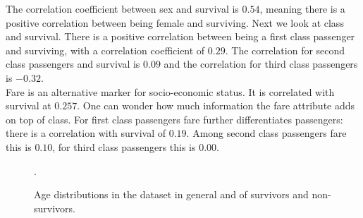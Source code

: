 \documentclass{llncs}
\begin{document}
The correlation coefficient between sex and survival is $0.54$, meaning there is a positive correlation between being female and surviving. Next we look at class and survival. There is a positive correlation between being a first class passenger and surviving, with a correlation coefficient of $0.29$. The correlation for second class passengers and survival is $0.09$ and the correlation for third class passengers is $-0.32$.\\
Fare is an alternative marker for socio-economic status. It is correlated with survival at $0.257$. One can wonder how much information the fare attribute adds on top of class. For first class passengers fare further differentiates passengers: there is a correlation with survival of $0.19$. Among second class passengers fare this is $0.10$, for third class passengers this is $0.00$.
\begin{figure}[]
    \centering
    \hfill
    \hfill
    \caption{Age distributions in the dataset in general and of survivors and non-survivors.}
    \label{fig:age_histogram}.
\end{figure}
\end{document}

